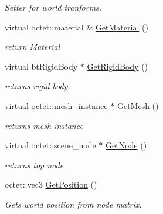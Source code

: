 \begin{DoxyCompactItemize}
\begin{DoxyCompactList}\small\item\em Setter for world tranforms. \end{DoxyCompactList}\item 
\hypertarget{class_arena_1_1_physics_object_a6f3c3b01b933d19be331473e83f50792}{virtual octet\+::material \& \hyperlink{class_arena_1_1_physics_object_a6f3c3b01b933d19be331473e83f50792}{Get\+Material} ()}\label{class_arena_1_1_physics_object_a6f3c3b01b933d19be331473e83f50792}

\begin{DoxyCompactList}\small\item\em return Material \end{DoxyCompactList}\item 
\hypertarget{class_arena_1_1_physics_object_a9b8197cee988ddfd57be2fd86d5ee404}{virtual bt\+Rigid\+Body $\ast$ \hyperlink{class_arena_1_1_physics_object_a9b8197cee988ddfd57be2fd86d5ee404}{Get\+Rigid\+Body} ()}\label{class_arena_1_1_physics_object_a9b8197cee988ddfd57be2fd86d5ee404}

\begin{DoxyCompactList}\small\item\em returns rigid body \end{DoxyCompactList}\item 
\hypertarget{class_arena_1_1_physics_object_a5d7d933148997b6a48511e5650b46c49}{virtual octet\+::mesh\+\_\+instance $\ast$ \hyperlink{class_arena_1_1_physics_object_a5d7d933148997b6a48511e5650b46c49}{Get\+Mesh} ()}\label{class_arena_1_1_physics_object_a5d7d933148997b6a48511e5650b46c49}

\begin{DoxyCompactList}\small\item\em returns mesh instance \end{DoxyCompactList}\item 
\hypertarget{class_arena_1_1_physics_object_a0e18b08f240a130fdc6aad588fcac72d}{virtual octet\+::scene\+\_\+node $\ast$ \hyperlink{class_arena_1_1_physics_object_a0e18b08f240a130fdc6aad588fcac72d}{Get\+Node} ()}\label{class_arena_1_1_physics_object_a0e18b08f240a130fdc6aad588fcac72d}

\begin{DoxyCompactList}\small\item\em returns top node \end{DoxyCompactList}\item 
\hypertarget{class_arena_1_1_physics_object_a8dbe1238d40acc779ba9ad599ffab09e}{octet\+::vec3 \hyperlink{class_arena_1_1_physics_object_a8dbe1238d40acc779ba9ad599ffab09e}{Get\+Position} ()}\label{class_arena_1_1_physics_object_a8dbe1238d40acc779ba9ad599ffab09e}

\begin{DoxyCompactList}\small\item\em Gets world position from node matrix. \end{DoxyCompactList}\end{DoxyCompactItemize}
